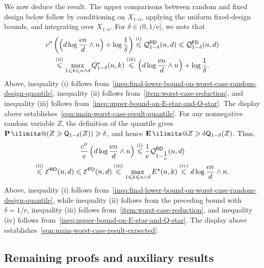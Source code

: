 \documentclass[11pt, letterpaper, hidelinks]{article}
\makeatletter
\newcommand{\cE}{\mathcal{E}}
\newcommand{\cQ}{\mathcal{Q}}
\newcommand{\twomin}[2]{\ensuremath{#1 \land #2}}
\newcommand{\e}{\mathrm{e}}
\newcommand{\1}{\mathbf 1}
\renewcommand{\leq}{\leqslant}
\renewcommand{\geq}{\geqslant}
\newcommand{\E}{\operatorname*{\mathbf{E}}\ilimits@}
\renewcommand{\P}{\operatorname*{\mathbf{P}}\ilimits@}
\theoremstyle{plain}
\theoremstyle{definition}
\newcommand{\Quant}[1]{\mathsf{Q}_{#1}}
\newcommand{\FD}{\mathsf{FD}}
\newcommand{\RD}{\mathsf{RD}}
\newcommand{\WorstCaseFixedDesign}[2]{\cE^\FD(#1,#2)}
\newcommand{\WorstCaseRandomDesign}[2]{\cE^\RD(#1,#2)}
\newcommand{\WorstCaseFixedDesignQuant}[3]{\cQ_{#1}^\FD(#2,#3)}
\newcommand{\WorstCaseRandomDesignQuant}[3]{\cQ_{#1}^\RD(#2,#3)}
\makeatother
\begin{document}
We now deduce the result. The upper comparisons between random and fixed design below follow by conditioning on $X_{1:n}$, applying the uniform fixed-design bounds, and integrating over $X_{1:n}$. For $\delta\in(0,1/\e]$, we note that 
\begin{multline}
c'' \, \bigg(\Big(\twomin{d \log \frac{\e n}{d}}{n}\Big) + \log \frac{1}{\delta}\bigg)
\stackrel{{\rm (i)}}{\leq}
\WorstCaseRandomDesignQuant{1-\delta}{n}{d} 
\leq
\WorstCaseFixedDesignQuant{1-\delta}{n}{d} 
\\
\stackrel{{\rm (ii)}}{\leq}
\max_{1 \leq k \leq \twomin{n}{d}} Q^\star_{1-\delta}(n,k)
\stackrel{{\rm (iii)}}{\leq}
\Big(\twomin{d \log \frac{\e n}{d}}{n}\Big) + \log \frac{1}{\delta}.
\end{multline}
Above, inequality (i) follows 
from~\eqref{ineq:final-lower-bound-on-worst-case-random-design-quantile}, 
inequality (ii) follows 
from~\ref{item:worst-case-reduction}, and
inequality (iii) follows from~\cref{ineq:upper-bound-on-E-star-and-Q-star}. 
The display above establishes~\cref{eqn:main-worst-case-result-quantile}.
For any nonnegative random variable $Z$, the definition of the quantile gives
$\P(Z\geq\Quant{1-\delta}(Z))\geq\delta$, and hence
$\E Z\geq\delta\Quant{1-\delta}(Z)$. Thus,
\begin{multline}
	\frac{c''}{\e} \, \Big(\twomin{d \log \frac{\e n}{d}}{n}\Big)
	\stackrel{{\rm (i)}}{\leq}
	\frac{1}{\e}\WorstCaseRandomDesignQuant{1-\tfrac{1}{\e}}{n}{d}
	\\\stackrel{{\rm (ii)}}{\leq}
	\WorstCaseRandomDesign{n}{d}
	\leq
	\WorstCaseFixedDesign{n}{d}
	\stackrel{{\rm (iii)}}{\leq} 
	\max_{1 \leq k \leq \twomin{n}{d}} E^\star(n,k)
	\stackrel{{\rm (iv)}}{\leq}
	\twomin{d \log \frac{\e n}{d}}{n}.
\end{multline}
Above, inequality (i) follows from~\eqref{ineq:final-lower-bound-on-worst-case-random-design-quantile}, while inequality (ii) follows from the preceding bound with $\delta=1/\e$, inequality 
(iii) follows from~\ref{item:worst-case-reduction}, 
and inequality (iv) follows from~\cref{ineq:upper-bound-on-E-star-and-Q-star}. 
The display above establishes~\cref{eqn:main-worst-case-result-expected}.

\subsection{Remaining proofs and auxiliary results}
\label{sec:remaining-and-aux}
	
\end{document}
